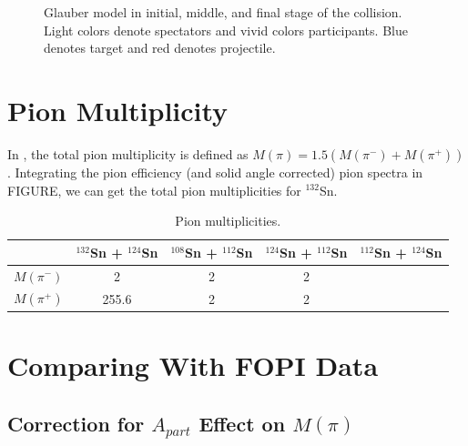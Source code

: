 \documentclass[12pt, letterpaper, twoside]{article}
\begin{document}
\begin{figure}[!hbt]
\begin{adjustbox}{max width=\linewidth,center}
\end{adjustbox}
\caption{Glauber model in initial, middle, and final stage of the collision. Light colors denote spectators and vivid colors participants. Blue denotes target and red denotes projectile.}
\label{fig:coll}

\end{figure}

\clearpage

\section{Pion Multiplicity}
In \cite{fopi}, the total pion multiplicity is defined as $M(\pi)=1.5(M(\pi^-)+M(\pi^+))$. Integrating the pion efficiency (and solid angle corrected) pion spectra in FIGURE, we can get the total pion multiplicities for ${}^{132}$Sn. 

\begin{table}[!htb]
\begin{center}
 \begin{tabular}{||c c c c c||}
 \hline
  & ${}^{132}$Sn + ${}^{124}$Sn & ${}^{108}$Sn + ${}^{112}$Sn & ${}^{124}$Sn + ${}^{112}$Sn & ${}^{112}$Sn + ${}^{124}$Sn\\ [0.5ex] 
 \hline\hline
  $M(\pi^-)$ & 2  & 2 & 2 & \\ [0.5ex]
 \hline\hline
 $M(\pi^+)$ &  255.6  &  2 & 2 & \\
 \hline
\end{tabular}
\end{center}
\caption{Pion multiplicities.}
\label{tb:pionmult}
\end{table}

\section{Comparing With FOPI Data}



\subsection{Correction for $A_{part}$ Effect on $M(\pi)$}
\end{document}
